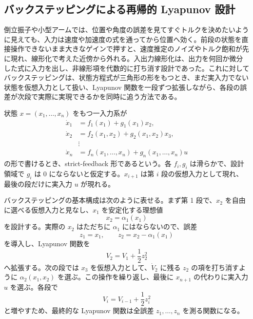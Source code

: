 \subsection{バックステッピングによる再帰的 Lyapunov 設計}

倒立振子や小型アームでは、位置や角度の誤差を見てすぐトルクを決めたいように見えても、入力は速度や加速度の式を通ってから位置へ効く。前段の状態を直接操作できないまま大きなゲインで押すと、速度推定のノイズやトルク飽和が先に現れ、線形化で考えた近傍から外れる。入出力線形化は、出力を何回か微分した式に入力を出し、非線形項を代数的に打ち消す設計であった。これに対してバックステッピングは、状態方程式が三角形の形をもつとき、まだ実入力でない状態を仮想入力として扱い、Lyapunov 関数を一段ずつ拡張しながら、各段の誤差が次段で実際に実現できるかを同時に追う方法である。

\begin{definition}
状態 $x=(x_1,\ldots,x_n)$ をもつ一入力系が
\begin{align}
  \dot{x}_1&=f_1(x_1)+g_1(x_1)x_2,\\
  \dot{x}_2&=f_2(x_1,x_2)+g_2(x_1,x_2)x_3,\\
  &\vdots\\
  \dot{x}_n&=f_n(x_1,\ldots,x_n)+g_n(x_1,\ldots,x_n)u
\end{align}
の形で書けるとき、strict-feedback 形であるという。各 $f_i,g_i$ は滑らかで、設計領域で $g_i$ は 0 にならないと仮定する。$x_{i+1}$ は第 $i$ 段の仮想入力として現れ、最後の段だけに実入力 $u$ が現れる。
\end{definition}

バックステッピングの基本構成は次のように表せる。まず第 1 段で、$x_2$ を自由に選べる仮想入力と見なし、$x_1$ を安定化する理想値
\begin{equation}
  x_2=\alpha_1(x_1)
\end{equation}
を設計する。実際の $x_2$ はただちに $\alpha_1$ にはならないので、誤差
\begin{equation}
  z_1=x_1,\qquad z_2=x_2-\alpha_1(x_1)
\end{equation}
を導入し、Lyapunov 関数を
\begin{equation}
  V_2=V_1+\frac{1}{2}z_2^2
\end{equation}
へ拡張する。次の段では $x_3$ を仮想入力として、$\dot{V}_2$ に残る $z_2$ の項を打ち消すように $\alpha_2(x_1,x_2)$ を選ぶ。この操作を繰り返し、最後に $x_{n+1}$ の代わりに実入力 $u$ を選ぶ。各段で
\begin{equation}
  V_i=V_{i-1}+\frac{1}{2}z_i^2
\end{equation}
と増やすため、最終的な Lyapunov 関数は全誤差 $z_1,\ldots,z_n$ を測る関数になる。

